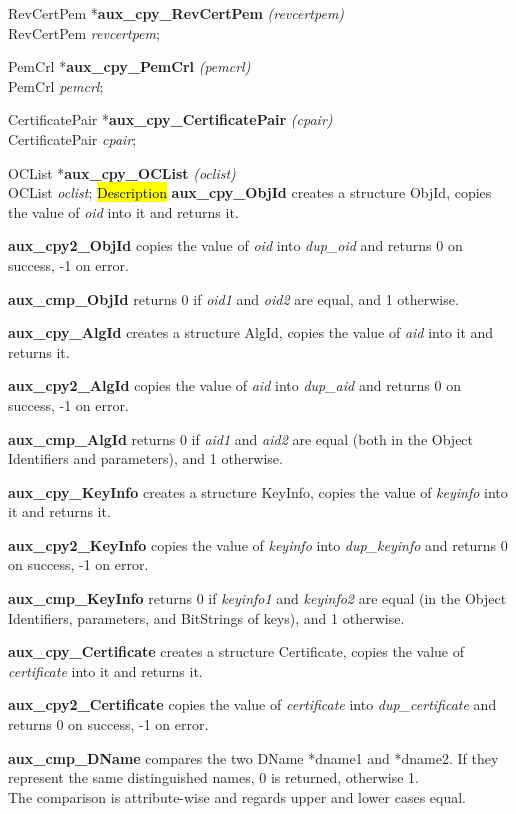 RevCertPem *{\bf aux\_cpy\_RevCertPem} {\em  (revcertpem)} \\
RevCertPem {\em *revcertpem};

PemCrl *{\bf aux\_cpy\_PemCrl} {\em  (pemcrl)} \\
PemCrl {\em *pemcrl};

CertificatePair *{\bf aux\_cpy\_CertificatePair} {\em  (cpair)} \\
CertificatePair {\em *cpair};

OCList *{\bf aux\_cpy\_OCList} {\em  (oclist)} \\
OCList {\em *oclist};
\hl{Description}
{\bf aux\_cpy\_ObjId} creates a structure ObjId, copies the value
of {\em oid} into it and returns it.
                   
{\bf aux\_cpy2\_ObjId} copies the value of {\em oid} into {\em dup\_oid}
and returns 0 on success, -1 on error.

{\bf aux\_cmp\_ObjId} returns 0 if {\em oid1} and {\em oid2} are equal,
and 1 otherwise.

{\bf aux\_cpy\_AlgId} creates a structure AlgId, copies the value
of {\em aid} into it and returns it.

{\bf aux\_cpy2\_AlgId} copies the value of {\em aid} into {\em dup\_aid}
and returns 0 on success, -1 on error.

{\bf aux\_cmp\_AlgId} returns 0 if {\em aid1} and {\em aid2} are equal
(both in the Object Identifiers and parameters),
and 1 otherwise.

{\bf aux\_cpy\_KeyInfo} creates a structure KeyInfo, copies the value
of {\em keyinfo} into it and returns it.

{\bf aux\_cpy2\_KeyInfo} copies the value of {\em keyinfo} into {\em dup\_keyinfo}
and returns 0 on success, -1 on error.

{\bf aux\_cmp\_KeyInfo} returns 0
if {\em keyinfo1} and {\em keyinfo2} are equal
(in the Object Identifiers, parameters, and BitStrings of keys),
and 1 otherwise.

{\bf aux\_cpy\_Certificate} creates a structure Certificate, copies the value
of {\em certificate} into it and returns it.

{\bf aux\_cpy2\_Certificate} copies the value of {\em certificate} into {\em dup\_certificate}
and returns 0 on success, -1 on error.

{\bf aux\_cmp\_DName} compares the two DName *dname1 and *dname2.
If they represent the same distinguished names,
0 is returned, otherwise 1. \\
The comparison is attribute-wise
and regards upper and lower cases equal.

